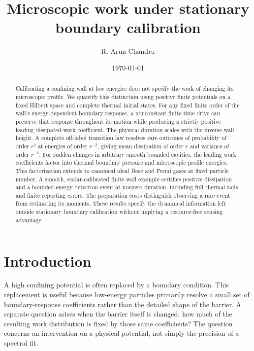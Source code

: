 \documentclass[aps,pra,reprint,superscriptaddress,longbibliography]{revtex4-2}
\begin{document}
\title{Microscopic work under stationary boundary calibration}
\author{R. Arun Chandru}
\date{\today}
\begin{abstract}
Calibrating a confining wall at low energies does not specify the work of changing its microscopic profile. We quantify this distinction using positive finite potentials on a fixed Hilbert space and complete thermal initial states. For any fixed finite order of the wall's energy-dependent boundary response, a nonconstant finite-time drive can preserve that response throughout its motion while producing a strictly positive leading dissipated-work coefficient. The physical duration scales with the inverse wall height. A complete off-label transition law resolves rare outcomes of probability of order $r^3$ at energies of order $r^{-2}$, giving mean dissipation of order $r$ and variance of order $r^{-1}$. For sudden changes in arbitrary smooth bounded cavities, the leading work coefficients factor into thermal boundary pressure and microscopic profile energies. This factorization extends to canonical ideal Bose and Fermi gases at fixed particle number. A smooth, scalar-calibrated finite-wall example certifies positive dissipation and a bounded-energy detection event at nonzero duration, including full thermal tails and finite reporting errors. The preparation costs distinguish observing a rare event from estimating its moments. These results specify the dynamical information left outside stationary boundary calibration without implying a resource-free sensing advantage.
\end{abstract}
\maketitle

\section{Introduction}

A high confining potential is often replaced by a boundary condition. This replacement is useful because low-energy particles primarily resolve a small set of boundary-response coefficients rather than the detailed shape of the barrier. A separate question arises when the barrier itself is changed: how much of the resulting work distribution is fixed by those same coefficients? The question concerns an intervention on a physical potential, not simply the precision of a spectral fit.
\end{document}
